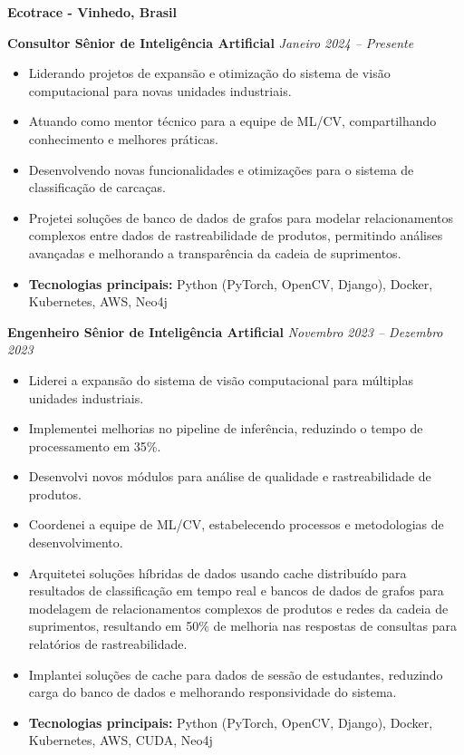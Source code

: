 \documentclass[12pt,a4paper,sans]{moderncv}
\begin{document}
\vspace{24pt}
\small{\textbf{Ecotrace - Vinhedo, Brasil}}
\vspace{3pt}

\textbf{Consultor Sênior de Inteligência Artificial} \hfill \textit{Janeiro 2024 -- Presente}
\begin{itemize}
    \item Liderando projetos de expansão e otimização do sistema de visão computacional para novas unidades industriais.
    \item Atuando como mentor técnico para a equipe de ML/CV, compartilhando conhecimento e melhores práticas.
    \item Desenvolvendo novas funcionalidades e otimizações para o sistema de classificação de carcaças.
    \item Projetei soluções de banco de dados de grafos para modelar relacionamentos complexos entre dados de rastreabilidade de produtos, permitindo análises avançadas e melhorando a transparência da cadeia de suprimentos.
    \item \textbf{Tecnologias principais:} Python (PyTorch, OpenCV, Django), Docker, Kubernetes, AWS, Neo4j
\end{itemize}

\vspace{12pt}
\textbf{Engenheiro Sênior de Inteligência Artificial} \hfill \textit{Novembro 2023 -- Dezembro 2023}
\begin{itemize}
    \item Liderei a expansão do sistema de visão computacional para múltiplas unidades industriais.
    \item Implementei melhorias no pipeline de inferência, reduzindo o tempo de processamento em 35\%.
    \item Desenvolvi novos módulos para análise de qualidade e rastreabilidade de produtos.
    \item Coordenei a equipe de ML/CV, estabelecendo processos e metodologias de desenvolvimento.
    \item Arquitetei soluções híbridas de dados usando cache distribuído para resultados de classificação em tempo real e bancos de dados de grafos para modelagem de relacionamentos complexos de produtos e redes da cadeia de suprimentos, resultando em 50\% de melhoria nas respostas de consultas para relatórios de rastreabilidade.
    \item Implantei soluções de cache para dados de sessão de estudantes, reduzindo carga do banco de dados e melhorando responsividade do sistema.
    \item \textbf{Tecnologias principais:} Python (PyTorch, OpenCV, Django), Docker, Kubernetes, AWS, CUDA, Neo4j
\end{itemize}
\end{document}
